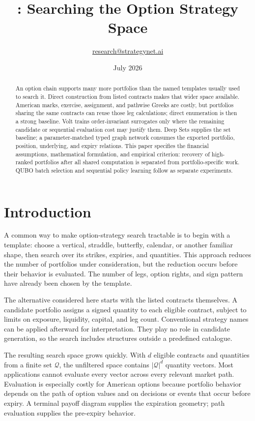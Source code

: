 \documentclass{strategynet-journal}
\title{\VOLT{}: Searching the Option Strategy Space}
\author{\href{mailto:research@strategynet.ai}{research@strategynet.ai}}
\date{July 2026}
\newcommand{\VOLT}{\textsf{Volt}}
\begin{document}
\maketitle

\begin{abstract}
An option chain supports many more portfolios than the named templates usually used to search it.  Direct construction from listed contracts makes that wider space available.  American marks, exercise, assignment, and pathwise Greeks are costly, but portfolios sharing the same contracts can reuse those leg calculations; direct enumeration is then a strong baseline.  \VOLT{} trains order-invariant surrogates only where the remaining candidate or sequential evaluation cost may justify them.  Deep Sets supplies the set baseline; a parameter-matched typed graph network consumes the exported portfolio, position, underlying, and expiry relations.  This paper specifies the financial assumptions, mathematical formulation, and empirical criterion: recovery of high-ranked portfolios after all shared computation is separated from portfolio-specific work.  QUBO batch selection and sequential policy learning follow as separate experiments.
\end{abstract}

\SNtwocolumntableofcontents

\section{Introduction}

A common way to make option-strategy search tractable is to begin with a
template: choose a vertical, straddle, butterfly, calendar, or another familiar
shape, then search over its strikes, expiries, and quantities.  This approach
reduces the number of portfolios under consideration, but the reduction occurs
before their behavior is evaluated.  The number of legs, option rights, and
sign pattern have already been chosen by the template.

The alternative considered here starts with the listed contracts themselves.
A candidate portfolio assigns a signed quantity to each eligible contract,
subject to limits on exposure, liquidity, capital, and leg count.  Conventional
strategy names can be applied afterward for interpretation.  They play no role
in candidate generation, so the search includes structures outside a
predefined catalogue.

The resulting search space grows quickly.  With \(d\) eligible contracts and
quantities from a finite set \(\mathcal Q\), the unfiltered space contains
\(|\mathcal Q|^d\) quantity vectors.  Most applications cannot evaluate every
vector across every relevant market path.  Evaluation is especially costly for
American options because portfolio behavior depends on the path of option
values and on decisions or events that occur before expiry.  A terminal payoff
diagram supplies the expiration geometry; path evaluation supplies the
pre-expiry behavior.
\end{document}
